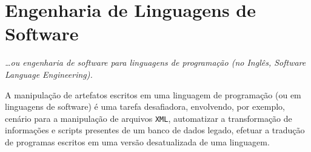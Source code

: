 

\section{Engenharia de Linguagens de Software}\label{sec:softEng}


\begin{flushright}
\emph{
\ldots ou engenharia de software para linguagens de programa\c c\~{a}o 
(no Ingl\^{e}s, Software Language Engineering).}
\end{flushright}

A manipulaç\~{a}o de artefatos escritos em 
uma linguagem de programaç\~{a}o (ou em linguagens de software) 
\'{e} uma tarefa desafiadora, envolvendo, por exemplo, cen\'{a}rio para a 
manipulaç\~{a}o de arquivos \texttt{XML}, automatizar a transformaç\~{a}o de 
informa\c c\~{o}es e scripts presentes 
de um banco de dados legado, efetuar a tradu\c c\~{a}o de programas 
escritos em uma vers\~{a}o desatualizada de uma linguagem. 

